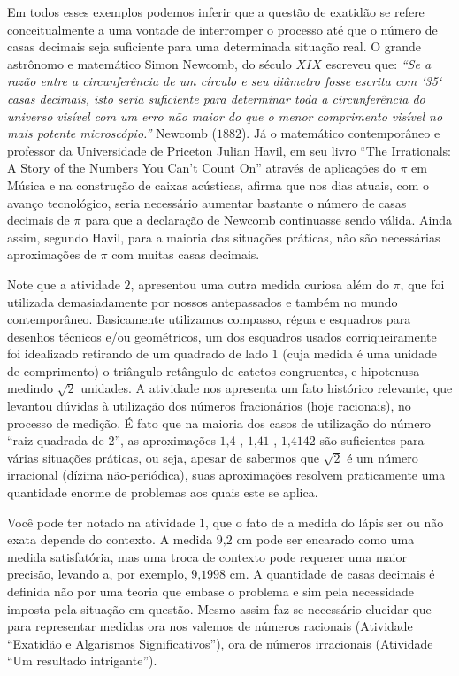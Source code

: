 Em todos esses exemplos podemos inferir que a questão de exatidão se refere conceitualmente a uma vontade de interromper o processo até que o número de casas decimais seja suficiente para uma determinada situação real. O grande astrônomo e matemático Simon Newcomb, do século \(XIX\) escreveu que:  \textit{“Se a razão entre a circunferência de um círculo e seu diâmetro fosse escrita com {}`35{}` casas decimais, isto seria suficiente para determinar toda a circunferência do universo visível com um erro não maior do que o menor comprimento visível no mais potente microscópio.”} Newcomb (\(1882\)). Já o matemático contemporâneo e professor da Universidade de Priceton Julian Havil, em seu livro “The Irrationals: A Story of the Numbers You Can’t Count On” através de aplicações do \(\pi\) em Música e na construção de caixas acústicas, afirma que nos dias atuais, com o avanço tecnológico, seria necessário aumentar bastante o número de casas decimais de \(\pi\) para que a declaração de Newcomb continuasse sendo válida. Ainda assim, segundo Havil, para a maioria das situações práticas, não são necessárias aproximações de \(\pi\) com muitas casas decimais.

Note que a atividade \(2\), apresentou uma outra medida curiosa além do \(\pi\), que foi utilizada demasiadamente por nossos antepassados e também no mundo contemporâneo. Basicamente utilizamos compasso, régua e esquadros para desenhos técnicos e/ou geométricos, um dos esquadros usados corriqueiramente foi idealizado retirando de um quadrado de lado \(1\) (cuja medida é uma unidade de comprimento) o triângulo retângulo de catetos congruentes, e hipotenusa medindo \(\sqrt{2}\) unidades. A atividade nos apresenta um fato histórico relevante, que levantou dúvidas à utilização dos números fracionários (hoje racionais), no processo de medição. É fato que na maioria dos casos de utilização do número “raiz quadrada de 2”, as aproximações \(1\text{,}4\) , \(1\text{,}41\) , \(1\text{,}4142\) são suficientes para várias situações práticas, ou seja, apesar de sabermos que \(\sqrt{2}\) é um número irracional (dízima não-periódica), suas aproximações resolvem praticamente uma quantidade enorme de problemas aos quais este se aplica.

Você pode ter notado na atividade \(1\), que o fato de a medida do lápis ser ou não exata depende do contexto. A medida \(9\text{,}2\) cm pode ser encarado como uma medida satisfatória, mas uma troca de contexto pode requerer uma maior precisão, levando a, por exemplo, \(9\text{,}1998\) cm. A quantidade de casas decimais é definida não por uma teoria que embase o problema e sim pela necessidade imposta pela situação em questão. Mesmo assim faz-se necessário elucidar que para representar medidas ora nos valemos de números racionais (Atividade “Exatidão e Algarismos Significativos”), ora de números irracionais (Atividade “Um resultado intrigante”).

